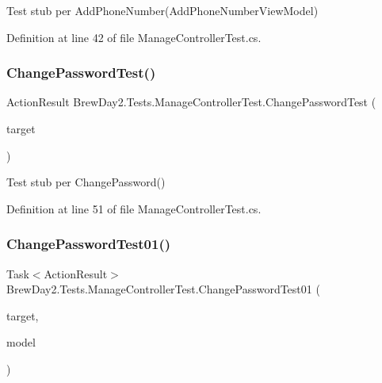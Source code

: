 Test stub per Add\+Phone\+Number(\+Add\+Phone\+Number\+View\+Model)



Definition at line 42 of file Manage\+Controller\+Test.\+cs.

\mbox{\label{class_brew_day2_1_1_tests_1_1_manage_controller_test_a081a246b5a24c46939096be6a69abb84}} 
\subsubsection{\texorpdfstring{Change\+Password\+Test()}{ChangePasswordTest()}}
{\footnotesize\ttfamily Action\+Result Brew\+Day2.\+Tests.\+Manage\+Controller\+Test.\+Change\+Password\+Test (\begin{DoxyParamCaption}\item[{\mbox{[}\+Pex\+Assume\+Under\+Test\mbox{]} \mbox{\hyperlink{class_brew_day2_1_1_controllers_1_1_manage_controller}{Manage\+Controller}}}]{target }\end{DoxyParamCaption})}



Test stub per Change\+Password()



Definition at line 51 of file Manage\+Controller\+Test.\+cs.

\mbox{\label{class_brew_day2_1_1_tests_1_1_manage_controller_test_a47719f7944b331f85d868a248c197a86}} 
\subsubsection{\texorpdfstring{Change\+Password\+Test01()}{ChangePasswordTest01()}}
{\footnotesize\ttfamily Task$<$Action\+Result$>$ Brew\+Day2.\+Tests.\+Manage\+Controller\+Test.\+Change\+Password\+Test01 (\begin{DoxyParamCaption}\item[{\mbox{[}\+Pex\+Assume\+Under\+Test\mbox{]} \mbox{\hyperlink{class_brew_day2_1_1_controllers_1_1_manage_controller}{Manage\+Controller}}}]{target,  }\item[{\mbox{\hyperlink{class_brew_day2_1_1_models_1_1_change_password_view_model}{Change\+Password\+View\+Model}}}]{model }\end{DoxyParamCaption})}



